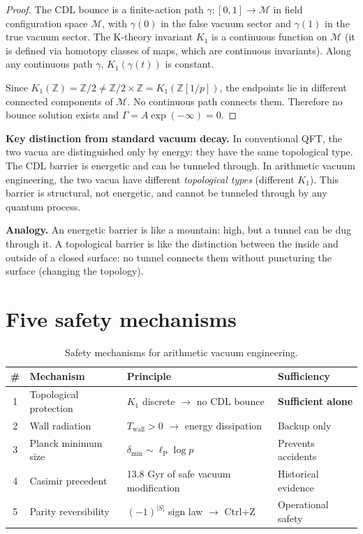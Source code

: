 \documentclass[11pt,a4paper]{article}
\newcommand{\Zp}{\mathbb{Z}[1/p]}
\newcommand{\lP}{\ell_{\mathrm{P}}}
\begin{document}
\begin{proof}
The CDL bounce is a finite-action path
$\gamma: [0,1] \to \mathcal{M}$ in field configuration space
$\mathcal{M}$, with $\gamma(0)$ in the false vacuum sector
and $\gamma(1)$ in the true vacuum sector. The K-theory
invariant $K_1$ is a continuous function on $\mathcal{M}$
(it is defined via homotopy classes of maps, which are
continuous invariants). Along any continuous path $\gamma$,
$K_1(\gamma(t))$ is constant.

Since $K_1(\mathbb{Z}) = \mathbb{Z}/2 \neq \mathbb{Z}/2 \times
\mathbb{Z} = K_1(\Zp)$, the endpoints lie in different
connected components of $\mathcal{M}$. No continuous path
connects them. Therefore no bounce solution exists and
$\Gamma = A \exp(-\infty) = 0$.
\end{proof}

\textbf{Key distinction from standard vacuum decay.}
In conventional QFT, the two vacua are distinguished only by
energy: they have the same topological type. The CDL barrier
is energetic and can be tunneled through. In arithmetic vacuum
engineering, the two vacua have different \emph{topological types}
(different $K_1$). This barrier is structural, not energetic,
and cannot be tunneled through by any quantum process.

\textbf{Analogy.} An energetic barrier is like a mountain:
high, but a tunnel can be dug through it. A topological barrier
is like the distinction between the inside and outside of a
closed surface: no tunnel connects them without puncturing
the surface (changing the topology).

\section{Five safety mechanisms}

\begin{table}[h]
\centering
\caption{Safety mechanisms for arithmetic vacuum engineering.}
\label{tab:safety}
\small
\begin{tabular}{@{}clll@{}}
\toprule
\# & Mechanism & Principle & Sufficiency \\
\midrule
1 & Topological protection & $K_1$ discrete $\to$ no CDL bounce & \textbf{Sufficient alone} \\
2 & Wall radiation & $T_{\mathrm{wall}} > 0$ $\to$ energy dissipation & Backup only \\
3 & Planck minimum size & $\delta_{\min} \sim \lP \log p$ & Prevents accidents \\
4 & Casimir precedent & 13.8 Gyr of safe vacuum modification & Historical evidence \\
5 & Parity reversibility & $(-1)^{|S|}$ sign law $\to$ Ctrl+Z & Operational safety \\
\bottomrule
\end{tabular}
\end{table}
\end{document}
